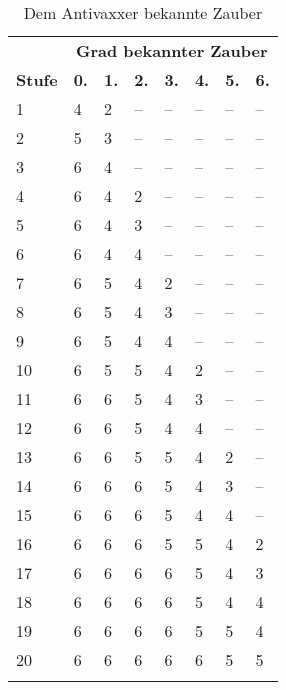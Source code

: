 \documentclass[
	ngerman,
	a4paper,
	10pt,
	twocolumn,
]{scrartcl}
\newlength{\thicktableline}
\newlength{\thintableline}
\newlength{\aboveline}
\newlength{\belowline}
\begin{document}
\begin{table}[htbp]
	\centering
	\caption{Dem Antivaxxer bekannte Zauber}
	\label{tab:Antivaxxer_bekannt}
	\footnotesize
	\begin{tabularx}{0.4\textwidth}{lXXXXXXX}
		\multicolumn{1}{c}{}	&\multicolumn{7}{c}{\textbf{Grad bekannter Zauber}}	\\
		\textbf{Stufe}	&\textbf{0.}	&\textbf{1.}	&\textbf{2.}	&\textbf{3.}	&\textbf{4.}	&\textbf{5.}	&\textbf{6.}	\\	\specialrule{\thicktableline}{\aboveline}{\belowline}
		1	&4	&2	&--	&--	&--	&--	&--	\\	\specialrule{\thintableline}{\aboveline}{\belowline}
		2	&5	&3	&--	&--	&--	&--	&--	\\	\specialrule{\thintableline}{\aboveline}{\belowline}
		3	&6	&4	&--	&--	&--	&--	&--	\\	\specialrule{\thintableline}{\aboveline}{\belowline}
		4	&6	&4	&2	&--	&--	&--	&--	\\	\specialrule{\thintableline}{\aboveline}{\belowline}
		5	&6	&4	&3	&--	&--	&--	&--	\\	\specialrule{\thintableline}{\aboveline}{\belowline}
		6	&6	&4	&4	&--	&--	&--	&--	\\	\specialrule{\thintableline}{\aboveline}{\belowline}
		7	&6	&5	&4	&2	&--	&--	&--	\\	\specialrule{\thintableline}{\aboveline}{\belowline}
		8	&6	&5	&4	&3	&--	&--	&--	\\	\specialrule{\thintableline}{\aboveline}{\belowline}
		9	&6	&5	&4	&4	&--	&--	&--	\\	\specialrule{\thintableline}{\aboveline}{\belowline}
		10	&6	&5	&5	&4	&2	&--	&--	\\	\specialrule{\thintableline}{\aboveline}{\belowline}
		11	&6	&6	&5	&4	&3	&--	&--	\\	\specialrule{\thintableline}{\aboveline}{\belowline}
		12	&6	&6	&5	&4	&4	&--	&--	\\	\specialrule{\thintableline}{\aboveline}{\belowline}
		13	&6	&6	&5	&5	&4	&2	&--	\\	\specialrule{\thintableline}{\aboveline}{\belowline}
		14	&6	&6	&6	&5	&4	&3	&--	\\	\specialrule{\thintableline}{\aboveline}{\belowline}
		15	&6	&6	&6	&5	&4	&4	&--	\\	\specialrule{\thintableline}{\aboveline}{\belowline}
		16	&6	&6	&6	&5	&5	&4	&2	\\	\specialrule{\thintableline}{\aboveline}{\belowline}
		17	&6	&6	&6	&6	&5	&4	&3	\\	\specialrule{\thintableline}{\aboveline}{\belowline}
		18	&6	&6	&6	&6	&5	&4	&4	\\	\specialrule{\thintableline}{\aboveline}{\belowline}
		19	&6	&6	&6	&6	&5	&5	&4	\\	\specialrule{\thintableline}{\aboveline}{\belowline}
		20	&6	&6	&6	&6	&6	&5	&5	\\	\specialrule{\thicktableline}{\aboveline}{\belowline}
	\end{tabularx}
\end{table}
\end{document}
